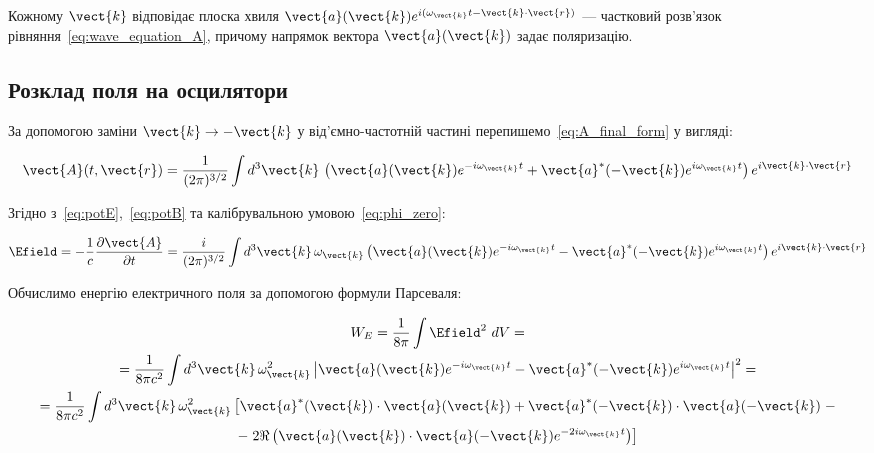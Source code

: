 Кожному \(\vect{k}\) відповідає плоска хвиля \(\vect{a}(\vect{k}) e^{i(\omega_{\vect{k}} t - \vect{k} \cdot \vect{r})}\)
--- частковий розв'язок рівняння~\eqref{eq:wave_equation_A}, причому напрямок вектора \(\vect{a}(\vect{k})\) задає
поляризацію.

\subsection*{Розклад поля на осцилятори}

За допомогою заміни \(\vect{k} \rightarrow -\vect{k}\) у від'ємно-частотній частині перепишемо~\eqref{eq:A_final_form} у
вигляді:

\begin{equation}
	\vect{A}(t, \vect{r}) = \frac{1}{(2\pi)^{3/2}} \int d^3\vect{k} \, \left( \vect{a}(\vect{k}) e^{-i\omega_{\vect{k}} t} + \vect{a}^*(-\vect{k})
	e^{i\omega_{\vect{k}} t} \right) e^{i\vect{k} \cdot \vect{r}}
	\label{eq:A_final_form_modified}
\end{equation}

Згідно з~\eqref{eq:potE},~\eqref{eq:potB} та калібрувальною умовою~\eqref{eq:phi_zero}:

\begin{equation}
	\Efield = -\frac{1}{c} \frac{\partial \vect{A}}{\partial t} = \frac{i}{(2\pi)^{3/2}} \int d^3\vect{k} \, \omega_{\vect{k}} \left( \vect{a}(\vect{k})
	e^{-i\omega_{\vect{k}} t} - \vect{a}^*(-\vect{k}) e^{i\omega_{\vect{k}} t} \right) e^{i\vect{k} \cdot \vect{r}}
	\label{eq:E_field_fourier}
\end{equation}

Обчислимо енергію електричного поля за допомогою формули Парсеваля:

\begin{multline*}
	W_E =
	\frac{1}{8\pi} \int \Efield^2\ dV
	= \\ =
	\frac{1}{8\pi c^2} \int d^3\vect{k} \, \omega_{\vect{k}}^2 \left|
	\vect{a}(\vect{k})e^{-i\omega_{\vect{k}} t} -
	\vect{a}^*(-\vect{k})e^{i\omega_{\vect{k}} t}
	\right|^2
	= \\ =
	\frac{1}{8\pi c^2} \int d^3\vect{k} \, \omega_{\vect{k}}^2 \left[
		\vect{a}^*(\vect{k}) \cdot \vect{a}(\vect{k}) +
		\vect{a}^*(-\vect{k}) \cdot \vect{a}(-\vect{k})
		\right.
		- \\ -
		\left. 2\Re \left( \vect{a}(\vect{k}) \cdot \vect{a}(-\vect{k}) e^{-2i\omega_{\vect{k}} t} \right)
		\right]
\end{multline*}

